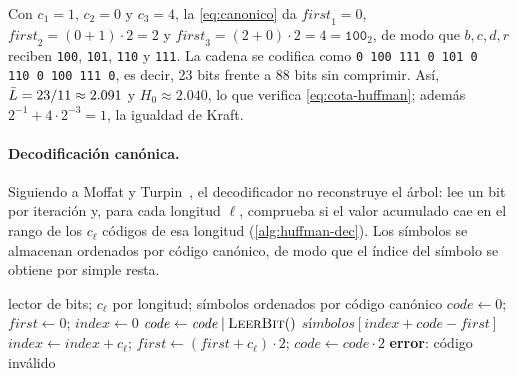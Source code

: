 Con $c_1 = 1$, $c_2 = 0$ y $c_3 = 4$, la \cref{eq:canonico} da $\mathit{first}_1 = 0$,
$\mathit{first}_2 = (0 + 1)\cdot 2 = 2$ y $\mathit{first}_3 = (2 + 0)\cdot 2 = 4 = \texttt{100}_2$, de modo que $b, c, d, r$
reciben \texttt{100}, \texttt{101}, \texttt{110} y \texttt{111}. La cadena se codifica como
\texttt{0\,100\,111\,0\,101\,0\,110\,0\,100\,111\,0}, es decir, 23 bits frente a 88 bits sin
comprimir. Así, $\bar{L} = 23/11 \approx 2.091$ y $H_0 \approx 2.040$, lo que verifica
\eqref{eq:cota-huffman}; además $2^{-1} + 4\cdot 2^{-3} = 1$, la igualdad de Kraft.

\paragraph{Decodificación canónica.} Siguiendo a Moffat y Turpin~\cite{moffat1997}, el
decodificador no reconstruye el árbol: lee un bit por iteración y, para cada longitud $\ell$,
comprueba si el valor acumulado cae en el rango de los $c_\ell$ códigos de esa longitud
(\cref{alg:huffman-dec}). Los símbolos se almacenan ordenados por código canónico, de modo que
el índice del símbolo se obtiene por simple resta.

\begin{algorithm}[H]
  \caption{Decodificación canónica de un símbolo (\texttt{decodeSymbol}).}
  \label{alg:huffman-dec}
  \small
  \begin{algorithmic}[1]
    \Require lector de bits; $c_\ell$ por longitud; símbolos ordenados por código canónico
    \State $\mathit{code} \gets 0$;\; $\mathit{first} \gets 0$;\; $\mathit{index} \gets 0$
      \State $\mathit{code} \gets \mathit{code} \mathbin{|} \textsc{LeerBit}()$
        \State \Return $\textit{símbolos}[\mathit{index} + \mathit{code} - \mathit{first}]$
      \EndIf
      \State $\mathit{index} \gets \mathit{index} + c_\ell$;\;
             $\mathit{first} \gets (\mathit{first} + c_\ell)\cdot 2$;\;
             $\mathit{code} \gets \mathit{code}\cdot 2$
    \EndFor
    \State \textbf{error}: código inválido
  \end{algorithmic}
\end{algorithm}

